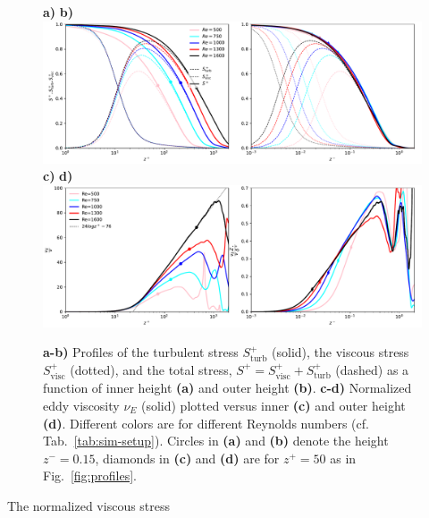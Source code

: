 \documentclass[a4paper,11pt]{amsart}
\begin{document}
\begin{figure}
  \begin{flushleft} 
    \textbf{a)}\hspace{0.47\textwidth} \textbf{b)}\\
    \includegraphics[width=\textwidth]{../plot/stresses.pdf}
    \textbf{c)}\hspace{0.47\textwidth} \textbf{d)}\\    
    \includegraphics[width=\textwidth]{../plot/eddy_viscosity.pdf}\\
  \end{flushleft} 
  \caption{
    \textbf{a-b)} Profiles of
    the turbulent stress $S_\mathrm{turb}^+$ (solid), 
    the viscous stress  $S_\mathrm{visc}^+$ (dotted), 
    and the total stress, $S^+=S_\mathrm{visc}^++S_\mathrm{turb}^+$ (dashed)
    as a function of inner height \textbf{(a)} and outer height \textbf{(b)}. 
    \textbf{c-d)} Normalized eddy viscosity $\nu_E$ (solid) plotted versus
    inner \textbf{(c)} and outer height \textbf{(d)}.
    Different colors are for different Reynolds numbers (cf. Tab.~\ref{tab:sim-setup}).
    Circles in \textbf{(a)} and \textbf{(b)} denote the height
    $z^-=0.15$, diamonds in \textbf{(c)} and \textbf{(d)} are for $z^+=50$
    as in Fig.~\ref{fig:profiles}.
    \label{fig:stresses}}  
\end{figure} 
The normalized viscous stress
\end{document}
